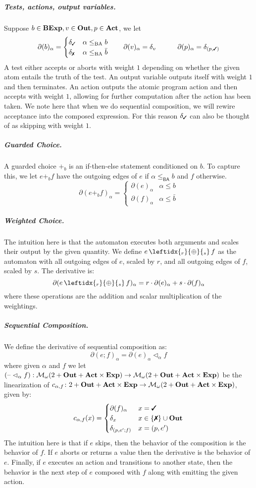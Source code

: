 \documentclass[a4paper,UKenglish,cleveref, autoref, thm-restate]{lipics-v2021}
\newcommand{\cmark}{\text{\ding{51}}}
\newcommand{\xmark}{\text{\ding{55}}}
\newcommand{\Out}{\textbf{\upshape{Out}}}
\newcommand{\Act}{\textbf{\upshape{Act}}}
\newcommand{\Exp}{\textbf{\upshape{Exp}}}
\newcommand{\BA}{\textsf{BA}}
\newcommand{\BExp}{\textbf{\upshape{BExp}}}
\newcommand{\WC}[2]{\,\leftidx{_{#1}}{{\oplus}}{_{#2}}\,}
\newcommand{\Mon}{\mathcal{M}_\omega}
\theoremstyle{plain}\newtheoremrep{thm}{Theorem}[section]
\begin{document}
\subparagraph*{Tests, actions, output variables.} Suppose $b \in \BExp, v \in \Out, p\in \Act$, we let
	$$
		\partial(b)_{\alpha} = \begin{cases}\delta_{\cmark} &\alpha\leq_{\text{BA}}b\\
			\delta_{\xmark} &\alpha\leq_{\text{BA}}\bar {b}
		\end{cases}
		\qquad\partial(v)_\alpha = \delta_v \;\;\;\;
		\qquad\partial(p)_\alpha = \delta_{(p,\cmark)}			   
	$$
	A test either accepts or aborts with weight $1$ depending on whether the given atom entails the truth of the test. An output variable outputs itself with weight $1$ and then terminates. An action outputs the atomic program action and then accepts with weight $1$, allowing for further computation after the action has been taken. We note here that when we do sequential composition, we will rewire acceptance into the composed expression. For this reason $\delta_\cmark$ can also be thought of as skipping with weight $1$.
	
	\subparagraph*{Guarded Choice.} A guarded choice $+_b$ is an if-then-else statement conditioned on $b$. To capture this, we let $e+_b f$ have the outgoing edges of $e$ if $\alpha \leq_{\BA} b$ and $f$ otherwise. 
	$$
		\partial(e +_b f)_\alpha = 
		\begin{cases}
			\partial(e)_\alpha & \alpha \leq b\\
			\partial(f)_\alpha & \alpha \leq \bar b
		\end{cases}
	$$
	
	\subparagraph*{Weighted Choice.} The intuition here is that the automaton executes both arguments and scales their output by the given quantity. We define $e \WC{r}{s} f$ as the automaton with all outgoing edges of $e$, scaled by $r$, and all outgoing edges of $f$, scaled by $s$. The derivative is: $$\partial(e \WC{r}{s} f)_\alpha = r\cdot\partial(e)_\alpha + s\cdot\partial(f)_\alpha$$
	where these operations are the addition and scalar multiplication of the weightings.
	\subparagraph*{Sequential Composition.}
	We define the derivative of sequential composition as: 
	$$
		\partial(e;f)_\alpha = \partial(e)_\alpha \vartriangleleft_\alpha f
	$$
	where given $\alpha$ and $f$ we let $(\text{\textendash} \vartriangleleft_\alpha f):\Mon(2+\Out+\Act\times \Exp) \to \Mon(2+\Out+\Act\times \Exp)$  be the linearization of $c_{\alpha, f} \colon 2+\Out+\Act\times \Exp \to \Mon(2+\Out+\Act\times \Exp)$, given by: 
	$$
		c_{\alpha, f}(x) = \begin{cases}
			\partial(f)_\alpha & x=\cmark\\
			\delta_x & x\in\{\xmark\} \cup \Out\\
			\delta_{(p,e^\prime;f)}& x=(p,e^\prime)
		\end{cases}
	$$
	The intuition here is that if $e$ skips, then the behavior of the composition is the behavior of $f$. If $e$ aborts or returns a value then the derivative is the behavior of $e$. Finally, if $e$ executes an action and transitions to another state, then the behavior is the next step of $e$ composed with $f$ along with emitting the given action. 
	
\end{document}
